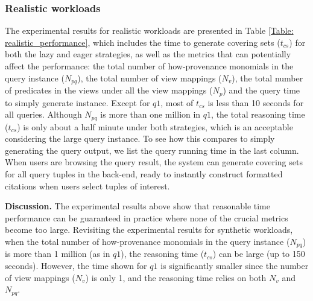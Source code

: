 \subsubsection{Realistic workloads}
\label{ssec: realistic}
The experimental results for realistic workloads are presented in Table \ref{Table: realistic_performance}, which includes the time to generate covering sets ($t_{cs}$) for both the lazy and eager strategies, as well as the metrics that can potentially affect the performance: the total number of how-provenance monomials in the query instance ($N_{pq}$), the total number of view mappings ($N_v$), the total number of predicates in the views under all the view mappings ($N_p$) and the query time to simply generate instance. Except for $q1$, most of $t_{cs}$ is less than 10 seconds for all queries. Although $N_{pq}$ is more than one million in $q1$, the total reasoning time ($t_{cs}$) is only about a half minute under both strategies, which is an acceptable considering the large query instance. To see how this compares to simply generating the query output, we list the query running time in the last column. When users are browsing the query result, the system can generate covering sets for all query tuples in the back-end, ready to instantly construct formatted citations when users select tuples of interest.


{\bf Discussion.} The experimental results above show that reasonable time performance can be guaranteed in practice where none of the crucial metrics become too large.  Revisiting the experimental results for synthetic workloads, when the total number of how-provenance monomials in the query instance ($N_{pq}$) is more than 1 million (as in $q1$), the reasoning time ($t_{cs}$) can be large (up to 150 seconds). However, the time shown for $q1$ is significantly smaller since the number of view mappings ($N_v$) is only 1, and the reasoning time relies on both $N_v$ and $N_{pq}$.




